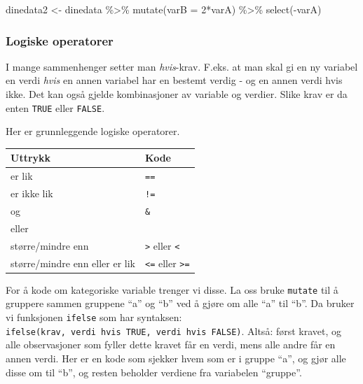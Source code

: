 \documentclass[
  letterpaper,
  DIV=11,
  numbers=noendperiod]{scrreprt}
\newenvironment{Shaded}{\begin{snugshade}}{\end{snugshade}}
\newcommand{\AttributeTok}[1]{\textcolor[rgb]{0.40,0.45,0.13}{#1}}
\newcommand{\DecValTok}[1]{\textcolor[rgb]{0.68,0.00,0.00}{#1}}
\newcommand{\FunctionTok}[1]{\textcolor[rgb]{0.28,0.35,0.67}{#1}}
\newcommand{\NormalTok}[1]{\textcolor[rgb]{0.00,0.23,0.31}{#1}}
\newcommand{\OtherTok}[1]{\textcolor[rgb]{0.00,0.23,0.31}{#1}}
\newcommand{\SpecialCharTok}[1]{\textcolor[rgb]{0.37,0.37,0.37}{#1}}
\theoremstyle{definition}
\theoremstyle{remark}
\begin{document}
\begin{Shaded}
\begin{Highlighting}[]
\NormalTok{dinedata2 }\OtherTok{\textless{}{-}}\NormalTok{ dinedata }\SpecialCharTok{\%\textgreater{}\%} 
  \FunctionTok{mutate}\NormalTok{(}\AttributeTok{varB =} \DecValTok{2}\SpecialCharTok{*}\NormalTok{varA) }\SpecialCharTok{\%\textgreater{}\%} 
  \FunctionTok{select}\NormalTok{(}\SpecialCharTok{{-}}\NormalTok{varA)}
\end{Highlighting}
\end{Shaded}

\hypertarget{logiske-operatorer}{%
\subsubsection{Logiske operatorer}\label{logiske-operatorer}}

I mange sammenhenger setter man \emph{hvis}-krav. F.eks. at man skal gi
en ny variabel en verdi \emph{hvis} en annen variabel har en bestemt
verdig - og en annen verdi hvis ikke. Det kan også gjelde kombinasjoner
av variable og verdier. Slike krav er da enten \texttt{TRUE} eller
\texttt{FALSE}.

Her er grunnleggende logiske operatorer.

\begin{longtable}[]{@{}ll@{}}
\toprule()
Uttrykk & Kode \\
\midrule()
\endhead
er lik & \texttt{==} \\
er ikke lik & \texttt{!=} \\
og & \texttt{\&} \\
eller & \texttt{\textbar{}} \\
større/mindre enn & \texttt{\textgreater{}} eller
\texttt{\textless{}} \\
større/mindre enn eller er lik & \texttt{\textless{}=} eller
\texttt{\textgreater{}=} \\
\bottomrule()
\end{longtable}

For å kode om kategoriske variable trenger vi disse. La oss bruke
\texttt{mutate} til å gruppere sammen gruppene ``a'' og ``b'' ved å
gjøre om alle ``a'' til ``b''. Da bruker vi funksjonen \texttt{ifelse}
som har syntaksen:
\texttt{ifelse(krav,\ verdi\ hvis\ TRUE,\ verdi\ hvis\ FALSE)}. Altså:
først kravet, og alle observasjoner som fyller dette kravet får en
verdi, mens alle andre får en annen verdi. Her er en kode som sjekker
hvem som er i gruppe ``a'', og gjør alle disse om til ``b'', og resten
beholder verdiene fra variabelen ``gruppe''.
\end{document}

